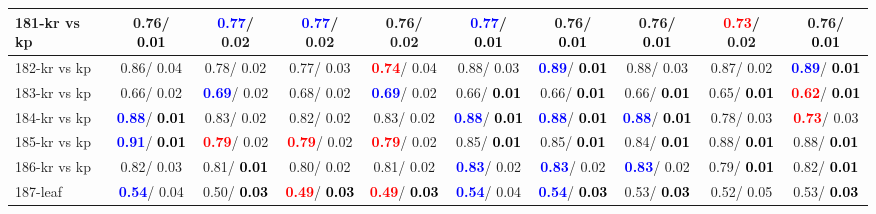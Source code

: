 \begin{table}[h]
\begin{center}
{\begin{tabular}{lc|c|c|c|c|c|c|c|c}
181-kr vs kp &   0.76/\textcolor{black}{\textbf{  0.01}} & \textcolor{blue}{\textbf{  0.77}}/  0.02 & \textcolor{blue}{\textbf{  0.77}}/  0.02 &   0.76/  0.02 & \textcolor{blue}{\textbf{  0.77}}/\textcolor{black}{\textbf{  0.01}} &   0.76/\textcolor{black}{\textbf{  0.01}} &   0.76/\textcolor{black}{\textbf{  0.01}} & \textcolor{red}{\textbf{  0.73}}/  0.02 &   0.76/\textcolor{black}{\textbf{  0.01}} \\ \hline
182-kr vs kp &   0.86/  0.04 &   0.78/  0.02 &   0.77/  0.03 & \textcolor{red}{\textbf{  0.74}}/  0.04 &   0.88/  0.03 & \textcolor{blue}{\textbf{  0.89}}/\textcolor{black}{\textbf{  0.01}} &   0.88/  0.03 &   0.87/  0.02 & \textcolor{blue}{\textbf{  0.89}}/\textcolor{black}{\textbf{  0.01}} \\
183-kr vs kp &   0.66/  0.02 & \textcolor{blue}{\textbf{  0.69}}/  0.02 &   0.68/  0.02 & \textcolor{blue}{\textbf{  0.69}}/  0.02 &   0.66/\textcolor{black}{\textbf{  0.01}} &   0.66/\textcolor{black}{\textbf{  0.01}} &   0.66/\textcolor{black}{\textbf{  0.01}} &   0.65/\textcolor{black}{\textbf{  0.01}} & \textcolor{red}{\textbf{  0.62}}/\textcolor{black}{\textbf{  0.01}} \\
184-kr vs kp & \textcolor{blue}{\textbf{  0.88}}/\textcolor{black}{\textbf{  0.01}} &   0.83/  0.02 &   0.82/  0.02 &   0.83/  0.02 & \textcolor{blue}{\textbf{  0.88}}/\textcolor{black}{\textbf{  0.01}} & \textcolor{blue}{\textbf{  0.88}}/\textcolor{black}{\textbf{  0.01}} & \textcolor{blue}{\textbf{  0.88}}/\textcolor{black}{\textbf{  0.01}} &   0.78/  0.03 & \textcolor{red}{\textbf{  0.73}}/  0.03 \\
185-kr vs kp & \textcolor{blue}{\textbf{  0.91}}/\textcolor{black}{\textbf{  0.01}} & \textcolor{red}{\textbf{  0.79}}/  0.02 & \textcolor{red}{\textbf{  0.79}}/  0.02 & \textcolor{red}{\textbf{  0.79}}/  0.02 &   0.85/\textcolor{black}{\textbf{  0.01}} &   0.85/\textcolor{black}{\textbf{  0.01}} &   0.84/\textcolor{black}{\textbf{  0.01}} &   0.88/\textcolor{black}{\textbf{  0.01}} &   0.88/\textcolor{black}{\textbf{  0.01}} \\
186-kr vs kp &   0.82/  0.03 &   0.81/\textcolor{black}{\textbf{  0.01}} &   0.80/  0.02 &   0.81/  0.02 & \textcolor{blue}{\textbf{  0.83}}/  0.02 & \textcolor{blue}{\textbf{  0.83}}/  0.02 & \textcolor{blue}{\textbf{  0.83}}/  0.02 &   0.79/\textcolor{black}{\textbf{  0.01}} &   0.82/\textcolor{black}{\textbf{  0.01}} \\
187-leaf & \textcolor{blue}{\textbf{  0.54}}/  0.04 &   0.50/\textcolor{black}{\textbf{  0.03}} & \textcolor{red}{\textbf{  0.49}}/\textcolor{black}{\textbf{  0.03}} & \textcolor{red}{\textbf{  0.49}}/\textcolor{black}{\textbf{  0.03}} & \textcolor{blue}{\textbf{  0.54}}/  0.04 & \textcolor{blue}{\textbf{  0.54}}/\textcolor{black}{\textbf{  0.03}} &   0.53/\textcolor{black}{\textbf{  0.03}} &   0.52/  0.05 &   0.53/\textcolor{black}{\textbf{  0.03}} \\

\end{tabular}}
\end{center}
\end{table}
